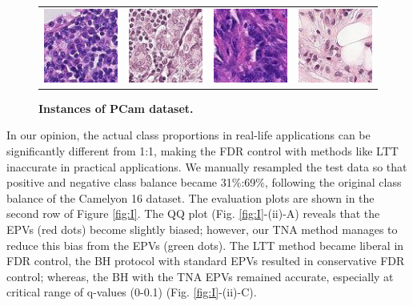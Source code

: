\documentclass{article}
\begin{document}
\begin{figure}[h!]
	\centering
	\begin{tabular}{cccc}
		\includegraphics[width=1.in]{img/pcam1.jpg} &
		\includegraphics[width=1.in]{img/pcam2.jpg} & 
		\includegraphics[width=1.in]{img/pcam3.jpg} &
		\includegraphics[width=1.in]{img/pcam4.jpg}
	\end{tabular}
	\caption{{\bf Instances of PCam dataset.}}
	\label{fig:pcam_example}
\end{figure} 
 
In our opinion, the actual class proportions in real-life applications can be significantly different from 1:1, making the FDR control with methods like LTT inaccurate in practical applications. We manually resampled the test data so that  positive and negative class balance became 31\%:69\%, following the original class balance of the Camelyon 16 dataset. The evaluation plots are shown in the second row of Figure \ref{fig:I}. The QQ plot (Fig. \ref{fig:I}-(ii)-A) reveals that the EPVs (red dots) become slightly biased; however, our TNA method manages to reduce this bias from the EPVs (green dots). The LTT method became liberal in FDR control, the BH protocol with standard EPVs resulted in conservative FDR control; whereas, the BH with the TNA EPVs remained accurate, especially at critical range of q-values (0-0.1) (Fig. \ref{fig:I}-(ii)-C).
\end{document}

